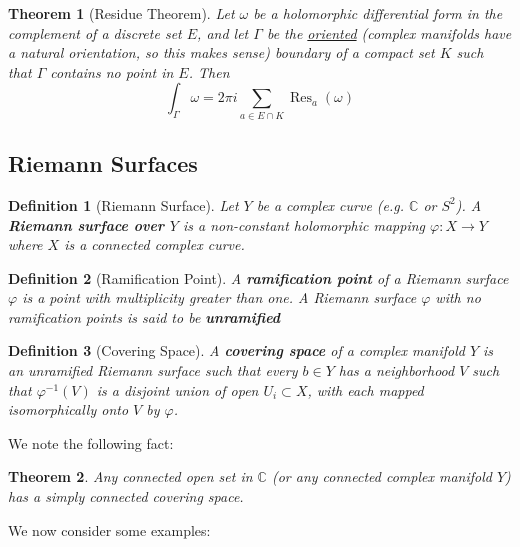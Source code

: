 \documentclass{article}
\newtheorem{theorem}{Theorem}
\newcommand{\mbb}[1]{\mathbb{#1}}
\newtheorem{definition}{Definition}
\DeclareMathOperator{\Res}{Res}
\begin{document}
\begin{theorem}[Residue Theorem]
Let \(\omega\) be a holomorphic differential form in the complement of a discrete set \(E\), and let \(\Gamma\) be the \underline{oriented} (complex manifolds have a natural orientation, so this makes sense) boundary of a compact set \(K\) such that \(\Gamma\) contains no point in \(E\). Then
\begin{equation}\int_\Gamma\omega = 2\pi i \sum_{a \in E \cap K}\Res_a(\omega)\end{equation}
\end{theorem}

\subsection{Riemann Surfaces}

\begin{definition}[Riemann Surface]
Let \(Y\) be a complex curve (e.g. \(\mbb{C}\) or \(S^2\)). A \textbf{Riemann surface over \(Y\)} is a non-constant holomorphic mapping \(\varphi: X \to Y\) where \(X\) is a connected complex curve.
\end{definition}

\begin{definition}[Ramification Point]
A \textbf{ramification point} of a Riemann surface \(\varphi\) is a point with multiplicity greater than one. A Riemann surface \(\varphi\) with no ramification points is said to be \textbf{unramified}
\end{definition}

\begin{definition}[Covering Space]
A \textbf{covering space} of a complex manifold \(Y\) is an unramified Riemann surface such that every \(b \in Y\) has a neighborhood \(V\) such that \(\varphi^{-1}(V)\) is a disjoint union of open \(U_i \subset X\), with each mapped isomorphically onto \(V\) by \(\varphi\).
\end{definition}

We note the following fact:
\begin{theorem}
Any connected open set in \(\mbb{C}\) (or any connected complex manifold \(Y\)) has a simply connected covering space.
\end{theorem}

We now consider some examples:
\end{document}
